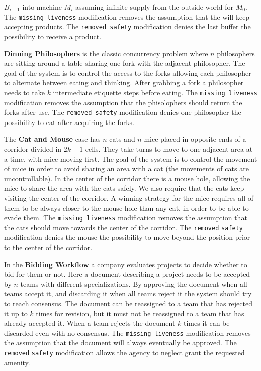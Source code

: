 \begin{description}[align=left,leftmargin=0.7cm,font=\normalfont,style=nextline,itemsep=0pt]
$B_{i -1}$ into machine $M_i$ assuming infinite supply from
the outside world for $M_0$. The \texttt{missing liveness} modification removes the assumption that the will keep accepting products. The \texttt{removed safety} modification denies the last buffer the possibility to receive a product.
\item[DP] \textbf{Dinning Philosophers} is the classic concurrency
problem where $n$ philosophers are sitting around a table sharing
one fork with the adjacent philosopher. The goal of
the system is to control the access to the forks allowing
each philosopher to alternate between eating and thinking.
After grabbing a fork a philosopher needs to take $k$ intermediate
etiquette steps before eating. The \texttt{missing liveness} modification removes the assumption that the phisolophers should return the forks after use. The \texttt{removed safety} modification denies one philosopher the possibility to eat after acquiring the forks.
\item[CM] The \textbf{Cat and Mouse} case has $n$ cats
and $n$ mice placed in opposite ends of a corridor
divided in $2k +1$ cells. They take turns to move to one
adjacent area at a time, with mice moving first. The goal
of the system is to control the movement of mice in order
to avoid sharing an area with a cat (the movements of cats
are uncontrollable). In the center of the corridor there is a
mouse hole, allowing the mice to share the area with the
cats safely. We also require that the cats keep visiting the center of the corridor. 
A winning strategy for the mice requires
all of them to be always closer to the mouse hole than any
cat, in order to be able to evade them. The \texttt{missing liveness} modification removes the assumption that the cats should move towards the center of the corridor. The \texttt{removed} \texttt{safety} modification denies the mouse the possibility to move beyond the position prior to the center of the corridor. 
\item[BW] In the \textbf{Bidding Workflow} a company evaluates projects to
decide whether to bid for them or not. Here a
document describing a project needs to be accepted by $n$
teams with different specializations. By approving the
document when all teams accept it, and discarding it when
all teams reject it the system should try to reach consensus. The document can be reassigned to a
team that has rejected it up to $k$ times for revision, but it
must not be reassigned to a team that has already accepted
it. When a team rejects the document $k$ times it can be
discarded even with no consensus. The \texttt{missing liveness} modification removes the assumption that the document will always eventually be approved. The  \texttt{removed} \texttt{safety} modification allows the agency to neglect grant the requested amenity. 

\end{description}
